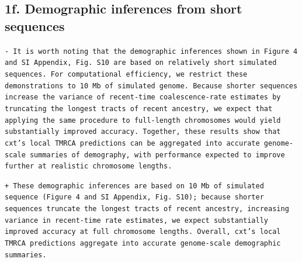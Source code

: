 \documentclass[10pt]{article}
\newcommand{\rem}[1]{\par\noindent\colorbox{rembg}{\parbox{\dimexpr\linewidth-2\fboxsep}{\small\textcolor{remtext}{\texttt{-\ #1}}}}}
\newcommand{\add}[1]{\par\noindent\colorbox{addbg}{\parbox{\dimexpr\linewidth-2\fboxsep}{\small\textcolor{addtext}{\texttt{+\ #1}}}}}
\begin{document}
\subsection*{\small 1f. Demographic inferences from short sequences}
\begin{mdframed}[style=diffbox]
\rem{It is worth noting that the demographic inferences shown in Figure 4 and SI Appendix, Fig. S10 are based on relatively short simulated sequences. For computational efficiency, we restrict these demonstrations to 10 Mb of simulated genome. Because shorter sequences increase the variance of recent-time coalescence-rate estimates by truncating the longest tracts of recent ancestry, we expect that applying the same procedure to full-length chromosomes would yield substantially improved accuracy. Together, these results show that cxt's local TMRCA predictions can be aggregated into accurate genome-scale summaries of demography, with performance expected to improve further at realistic chromosome lengths.}
\add{These demographic inferences are based on 10 Mb of simulated sequence (Figure 4 and SI Appendix, Fig. S10); because shorter sequences truncate the longest tracts of recent ancestry, increasing variance in recent-time rate estimates, we expect substantially improved accuracy at full chromosome lengths. Overall, cxt's local TMRCA predictions aggregate into accurate genome-scale demographic summaries.}
\end{mdframed}
\end{document}
